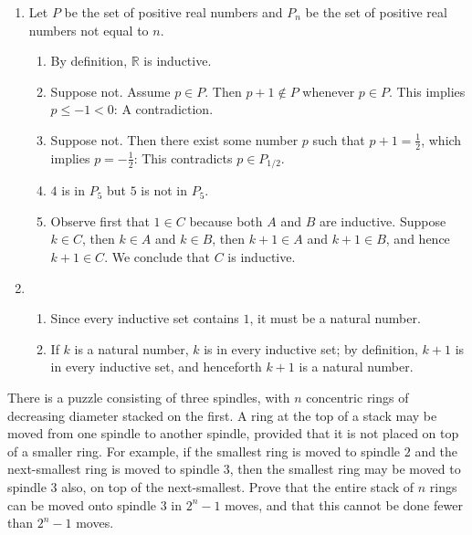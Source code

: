 \begin{solution} %
  \begin{enumerate}[label=(\alph*)]
    \item Let $P$ be the set of positive real numbers and
    $P_{n}$ be the set of positive real numbers
    not equal to $n$.
    \begin{enumerate}[label=(\roman*)]
      \item By definition, $\mathbb{R}$ is inductive.
      \item Suppose not. Assume $p \in P$.
      Then $p + 1 \notin P$ whenever
      $p \in P$. This implies $p \leq -1 < 0$: A contradiction.
      \item Suppose not. Then there exist some number $p$
      such that $p + 1 = \frac{1}{2}$, which implies
      $p = - \frac{1}{2}$: This contradicts $p \in P_{1/2}$.
      \item $4$ is in $P_5$ but $5$ is not in $P_5$.
      \item Observe first that $1 \in C$ because both $A$
      and $B$ are inductive. Suppose $k \in C$, then
      $k \in A$ and $k \in B$, then $k + 1 \in A$ and
      $k + 1 \in B$, and hence $k + 1 \in C$. We conclude
      that $C$ is inductive.
    \end{enumerate}
    \item
    \begin{enumerate}[label=(\roman*)]
      \item Since every inductive set contains $1$, it must
      be a natural number.
      \item If $k$ is a natural number, $k$ is in every
      inductive set; by definition, $k + 1$ is in every
      inductive set, and henceforth $k + 1$ is a natural
      number.
    \end{enumerate}
  \end{enumerate}
\end{solution}

\begin{pr} \label{2.26} %
  There is a puzzle consisting of three spindles, with
  $n$ concentric rings of decreasing diameter stacked
  on the first. A ring at the top of a stack may be moved
  from one spindle to another spindle, provided that it is
  not placed on top of a smaller ring. For example,
  if the smallest ring is moved to spindle $2$ and the next-smallest
  ring is moved to spindle $3$, then the smallest ring
  may be moved to spindle $3$ also, on top of the next-smallest.
  Prove that the entire stack of $n$ rings can be moved onto
  spindle $3$ in $2^n - 1$ moves, and that this cannot be
  done fewer than $2^n - 1$ moves.
\end{pr}

